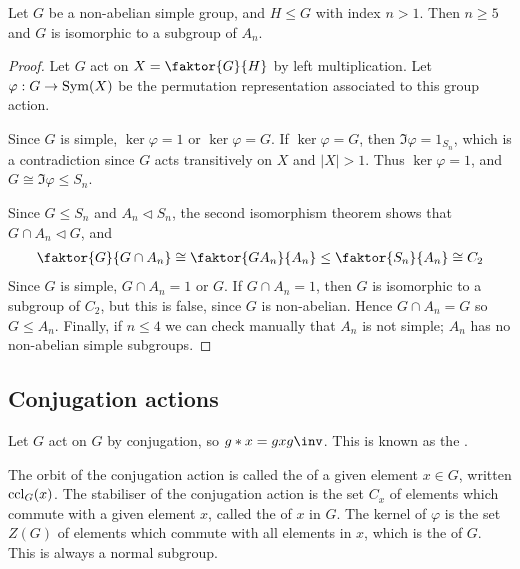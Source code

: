 \begin{theorem}
	Let $G$ be a non-abelian simple group, and $H \leq G$ with index $n > 1$.
	Then $n \geq 5$ and $G$ is isomorphic to a subgroup of $A_n$.
\end{theorem}

\begin{proof}
	Let $G$ act on $X = \faktor{G}{H}$ by left multiplication.
	Let $\varphi : G \to \operatorname{Sym}(X)$ be the permutation representation associated to this group action.

	Since $G$ is simple, $\ker \varphi = 1$ or $\ker \varphi = G$.
	If $\ker \varphi = G$, then $\Im\varphi = 1_{S_n}$, which is a contradiction since $G$ acts transitively on $X$ and $|X| > 1$.
	Thus $\ker \varphi = 1$, and $G \cong \Im\varphi \leq S_n$.

	Since $G \leq S_n$ and $A_n \triangleleft S_n$, the second isomorphism theorem shows that $G \cap A_n \triangleleft G$, and
	\begin{align*}
		\faktor{G}{G \cap A_n} \cong \faktor{GA_n}{A_n} \leq \faktor{S_n}{A_n} \cong C_2
	\end{align*}
	Since $G$ is simple, $G \cap A_n = 1$ or $G$.
	If $G \cap A_n = 1$, then $G$ is isomorphic to a subgroup of $C_2$, but this is false, since $G$ is non-abelian.
	Hence $G \cap A_n = G$ so $G \leq A_n$.
	Finally, if $n \leq 4$ we can check manually that $A_n$ is not simple; $A_n$ has no non-abelian simple subgroups.
\end{proof}

\subsection{Conjugation actions}
\begin{example}
	Let $G$ act on $G$ by conjugation, so $g \ast x = g x g\inv$.
	This is known as the .
\end{example}

\begin{definition}
	The orbit of the conjugation action is called the  of a given element $x \in G$, written $\operatorname{ccl}_G(x)$.
	The stabiliser of the conjugation action is the set $C_x$ of elements which commute with a given element $x$, called the  of $x$ in $G$.
	The kernel of $\varphi$ is the set $Z(G)$ of elements which commute with all elements in $x$, which is the  of $G$.
	This is always a normal subgroup.
\end{definition}

